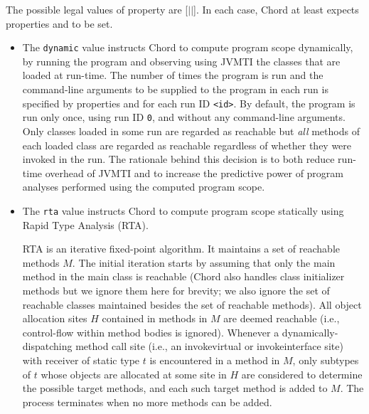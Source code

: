 The possible legal values of property  are
[$|$$|$].  In each case, Chord at
least expects properties  and
 to be set.

\begin{itemize}
\item
The {\tt dynamic} value instructs Chord to compute program scope
dynamically, by running the program and observing using JVMTI the
classes that are loaded at run-time.  The number of times the program
is run and the command-line arguments to be supplied to the program in
each run is specified by properties  and
 for each run ID {\tt <id>}.  By default, the
program is run only once, using run ID {\tt 0}, and without any
command-line arguments.  Only classes loaded in some run are regarded
as reachable but {\it all} methods of each loaded class are regarded
as reachable regardless of whether they were invoked in the run.  The
rationale behind this decision is to both reduce run-time overhead of
JVMTI and to increase the predictive power of program analyses
performed using the computed program scope.

\item
The {\tt rta} value instructs Chord to compute program scope
statically using Rapid Type Analysis (RTA).

RTA is an iterative fixed-point algorithm.  It maintains a set of
reachable methods $M$.  The initial iteration starts by assuming that
only the main method in the main class is reachable (Chord also
handles class initializer methods but we ignore them here for brevity;
we also ignore the set of reachable classes maintained besides the set
of reachable methods).  All object allocation sites $H$ contained in
methods in $M$ are deemed reachable (i.e., control-flow within method
bodies is ignored).  Whenever a dynamically-dispatching method call
site (i.e., an invokevirtual or invokeinterface site) with receiver of
static type $t$ is encountered in a method in $M$, only subtypes of
$t$ whose objects are allocated at some site in $H$ are considered to
determine the possible target methods, and each such target method is
added to $M$.  The process terminates when no more methods can be
added.


\end{itemize}
